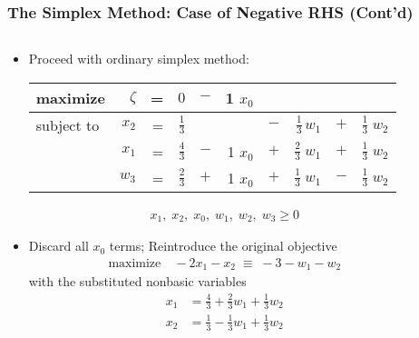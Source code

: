 \documentclass[usenames,dvipsnames,8pt]{beamer}%
\begin{document}
\begin{frame}
  \frametitle{The Simplex Method: Case of Negative RHS (Cont'd)}
  \begin{columns}
    \begin{column}{0.5\textwidth}
      \begin{itemize}
        \item Proceed with ordinary simplex method:  
          \vspace{0.1cm}
          \begin{table}[ht]
            \centering
            \setlength\tabcolsep{2pt}
            \begin{tabular}{lrrrcrcrcr}
              \toprule
              maximize   &$\zeta$& = & $0$ & $-$ & 1 $x_0$ &  &  &  &  \\
              \midrule
              subject to & $x_2$ & = & $\frac{1}{3}$ &  & & $-$ & $\frac{1}{3}\,w_1$ & $+$ & $\frac{1}{3}\;w_2$ \\
                         & $x_1$ & = & $\frac{4}{3}$ & $-$ & 1 $x_0$ & $+$ & $\frac{2}{3}\;w_1$ & $+$ & $\frac{1}{3}\;w_2$\\
                         & $w_3$ & = & $\frac{2}{3}$ & $+$ & 1 $x_0$ & $+$ & $\frac{1}{3}\;w_1$ & $-$ &$\frac{1}{3}\;w_2$ \\ 
              \bottomrule
            \end{tabular}
          \end{table}
          \vspace{-0.4cm}
          \begin{align*}
            x_1,\;x_2,\;x_0,\;w_1,\;w_2,\;w_3\geqslant 0
          \end{align*}
        \item Discard all $x_0$ terms; Reintroduce the original objective 
          \begin{align*}
            \text{maximize}\quad -2 x_1 - x_2 \;\equiv\; -3 - w_1 - w_2 
          \end{align*}
          with the substituted nonbasic variables 
          \begin{align*}
            x_1 &= \frac{4}{3} + \frac{2}{3}w_1 + \frac{1}{3} w_2\\
            x_2 &= \frac{1}{3} - \frac{1}{3}w_1 + \frac{1}{3} w_2
          \end{align*}
      \end{itemize}
    \end{column}
    \begin{column}{0.5\textwidth}
      \vspace{-16mm}

\end{column}
\end{columns}
\end{frame}
\end{document}
